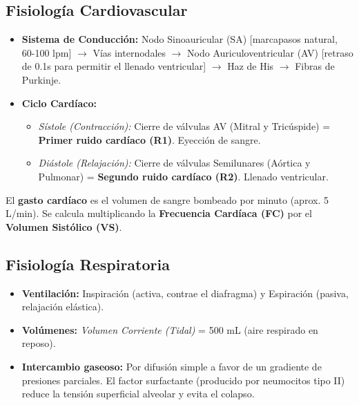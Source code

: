 \subsection{Fisiología Cardiovascular}
\begin{itemize}
    \item \textbf{Sistema de Conducción:} Nodo Sinoauricular (SA) [marcapasos natural, 60-100 lpm] $\rightarrow$ Vías internodales $\rightarrow$ Nodo Auriculoventricular (AV) [retraso de 0.1s para permitir el llenado ventricular] $\rightarrow$ Haz de His $\rightarrow$ Fibras de Purkinje.
    \item \textbf{Ciclo Cardíaco:}
    \begin{itemize}
        \item \textit{Sístole (Contracción):} Cierre de válvulas AV (Mitral y Tricúspide) = \textbf{Primer ruido cardíaco (R1)}. Eyección de sangre.
        \item \textit{Diástole (Relajación):} Cierre de válvulas Semilunares (Aórtica y Pulmonar) = \textbf{Segundo ruido cardíaco (R2)}. Llenado ventricular.
    \end{itemize}
\end{itemize}
\begin{tcolorbox}[colback=blue!5!white,colframe=blue!75!black,title=Nota de estudio]
El \textbf{gasto cardíaco} es el volumen de sangre bombeado por minuto (aprox. 5 L/min). Se calcula multiplicando la \textbf{Frecuencia Cardíaca (FC)} por el \textbf{Volumen Sistólico (VS)}.
\end{tcolorbox}

\subsection{Fisiología Respiratoria}
\begin{itemize}
    \item \textbf{Ventilación:} Inspiración (activa, contrae el diafragma) y Espiración (pasiva, relajación elástica).
    \item \textbf{Volúmenes:} \textit{Volumen Corriente (Tidal)} = 500 mL (aire respirado en reposo).
    \item \textbf{Intercambio gaseoso:} Por difusión simple a favor de un gradiente de presiones parciales. El factor surfactante (producido por neumocitos tipo II) reduce la tensión superficial alveolar y evita el colapso.
\end{itemize}

